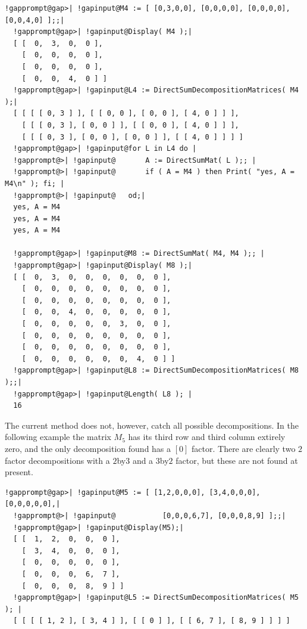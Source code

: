 \documentclass[a4paper,11pt]{report}
\begin{document}
{{{\begin{Verbatim}[commandchars=!@|,fontsize=\small,frame=single,label=Example]
  !gapprompt@gap>| !gapinput@M4 := [ [0,3,0,0], [0,0,0,0], [0,0,0,0], [0,0,4,0] ];;|
  !gapprompt@gap>| !gapinput@Display( M4 );|
  [ [  0,  3,  0,  0 ],
    [  0,  0,  0,  0 ],
    [  0,  0,  0,  0 ],
    [  0,  0,  4,  0 ] ]
  !gapprompt@gap>| !gapinput@L4 := DirectSumDecompositionMatrices( M4 );|
  [ [ [ [ 0, 3 ] ], [ [ 0, 0 ], [ 0, 0 ], [ 4, 0 ] ] ], 
    [ [ [ 0, 3 ], [ 0, 0 ] ], [ [ 0, 0 ], [ 4, 0 ] ] ], 
    [ [ [ 0, 3 ], [ 0, 0 ], [ 0, 0 ] ], [ [ 4, 0 ] ] ] ]
  !gapprompt@gap>| !gapinput@for L in L4 do |
  !gapprompt@>| !gapinput@       A := DirectSumMat( L );; |
  !gapprompt@>| !gapinput@       if ( A = M4 ) then Print( "yes, A = M4\n" ); fi; |
  !gapprompt@>| !gapinput@   od;|
  yes, A = M4
  yes, A = M4
  yes, A = M4
  
  !gapprompt@gap>| !gapinput@M8 := DirectSumMat( M4, M4 );; |
  !gapprompt@gap>| !gapinput@Display( M8 );|
  [ [  0,  3,  0,  0,  0,  0,  0,  0 ],
    [  0,  0,  0,  0,  0,  0,  0,  0 ],
    [  0,  0,  0,  0,  0,  0,  0,  0 ],
    [  0,  0,  4,  0,  0,  0,  0,  0 ],
    [  0,  0,  0,  0,  0,  3,  0,  0 ],
    [  0,  0,  0,  0,  0,  0,  0,  0 ],
    [  0,  0,  0,  0,  0,  0,  0,  0 ],
    [  0,  0,  0,  0,  0,  0,  4,  0 ] ]
  !gapprompt@gap>| !gapinput@L8 := DirectSumDecompositionMatrices( M8 );;|
  !gapprompt@gap>| !gapinput@Length( L8 ); |
  16
\end{Verbatim}
 

 The current method does not, however, catch all possible decompositions. In
the following example the matrix $M_5$ has its third row and third column extirely zero, and the only decomposition
found has a $[0]$ factor. There are clearly two $2$\texttt{}factor decompositions with a $2$\texttt{}by\texttt{}$3$ and a $3$\texttt{}by\texttt{}$2$ factor, but these are not found at present. 

 
\begin{Verbatim}[commandchars=!@|,fontsize=\small,frame=single,label=Example]
  !gapprompt@gap>| !gapinput@M5 := [ [1,2,0,0,0], [3,4,0,0,0], [0,0,0,0,0],|
  !gapprompt@>| !gapinput@           [0,0,0,6,7], [0,0,0,8,9] ];;|
  !gapprompt@gap>| !gapinput@Display(M5);|
  [ [  1,  2,  0,  0,  0 ],
    [  3,  4,  0,  0,  0 ],
    [  0,  0,  0,  0,  0 ],
    [  0,  0,  0,  6,  7 ],
    [  0,  0,  0,  8,  9 ] ]
  !gapprompt@gap>| !gapinput@L5 := DirectSumDecompositionMatrices( M5 ); |
  [ [ [ [ 1, 2 ], [ 3, 4 ] ], [ [ 0 ] ], [ [ 6, 7 ], [ 8, 9 ] ] ] ]
\end{Verbatim}
 }

 }

 }
\end{document}
